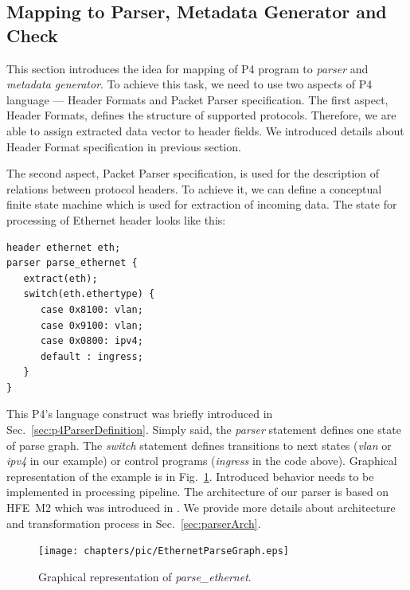 \subsection{Mapping to Parser, Metadata Generator and Check}
\label{sec:mappingToParserMetadataCheck}
This section introduces the idea for mapping of P4 program to \emph{parser} and \emph{metadata generator}. 
To achieve this task, we need to 
use two aspects of P4 language --- Header Formats and Packet Parser specification.
The first aspect, Header Formats, defines the structure of supported protocols. 
Therefore, we are able to assign extracted data vector to header fields.
We introduced details about Header Format specification in previous section.

The second aspect, Packet Parser specification, is used for the description of relations between protocol headers.
To achieve it, we can define a conceptual finite state machine which is used for extraction of incoming data.
The state for processing of Ethernet header looks like this:
\begin{Verbatim}[fontsize=\small]
header ethernet eth;
parser parse_ethernet {
   extract(eth);
   switch(eth.ethertype) {
      case 0x8100: vlan;
      case 0x9100: vlan;
      case 0x0800: ipv4;
      default : ingress;
   }
}
\end{Verbatim}

This P4's language construct was briefly introduced in Sec.~\ref{sec:p4ParserDefinition}. Simply said, the \textit{parser} 
statement defines one state of parse graph. The \textit{switch} statement defines transitions to next states (\textit{vlan} or \textit{ipv4} 
in our example) or control programs (\textit{ingress} in the code above). Graphical representation of the example is in
Fig.~\ref{fig:parseEthernetRepresentation}.
Introduced behavior needs to be implemented in processing pipeline. The architecture of
our parser is based on HFE~M2 which was introduced in \cite{hfem2}. 
We provide more details about architecture and transformation process in Sec.~\ref{sec:parserArch}.

\begin{figure}[h]
    \centering
    \texttt{[image: chapters/pic/EthernetParseGraph.eps]}
    \caption{Graphical representation of \textit{parse\_ethernet}.}
    \label{fig:parseEthernetRepresentation}
\end{figure}

